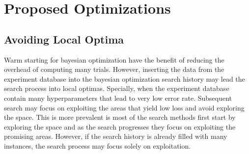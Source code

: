 \section{Proposed Optimizations} \label{sec-proposed-optimizations}

\subsection{Avoiding Local Optima}
Warm starting for bayesian optimization have the benefit of reducing the overhead of computing many trials.
However, inserting the data from the experiment database into the bayesian optimization search history may lead the search process into local optimas.
Specially, when the experiment database contain many hyperparameters that lead to very low error rate.
Subsequent search may focus on exploiting the areas that yield low loss and avoid exploring the space.
This is more prevalent is most of the search methods first start by exploring the space and as the search progresses they focus on exploiting the promising areas.
However, if the search history is already filled with many instances, the search process may focus solely on exploitation.

